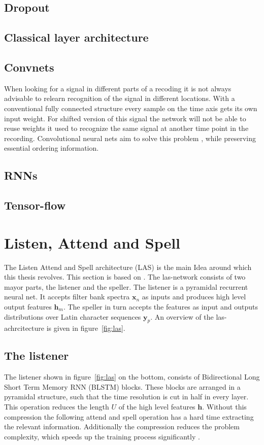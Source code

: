 \subsection{Dropout}

\subsection{Classical layer architecture}


\subsection{Convnets}
When looking for a signal in different parts of a recoding it is not always advisable to relearn recognition
of the signal in different locations. With a conventional fully connected structure every sample on the time axis gets its own input weight. For shifted version of this signal the network will not be able to reuse weights it used
to recognize the same signal at another time point in the recording.
Convolutional neural nets aim to solve this problem \cite[page 6]{Dumoulin2016}, while preserving essential ordering information.

\subsection{RNNs}


\subsection{Tensor-flow}


\section{Listen, Attend and Spell}
The Listen Attend and Spell architecture (LAS) is the main Idea around which this thesis revolves. This section is based on \cite{Chan2015}. The las-network consists of two mayor parts, the listener and the speller. The listener is a pyramidal recurrent neural net. It accepts filter bank spectra $\mathbf{x}_n$ as inputs and produces high level output features $\mathbf{h}_m$. The speller in turn accepts the features as input and outputs distributions over Latin character sequences $\mathbf{y}_p$. An overview of the las-achrcitecture is given in figure~\ref*{fig:las}.

\subsection{The listener}
The listener shown in figure~\ref*{fig:las} on the bottom, consists of Bidirectional Long Short Term Memory RNN (BLSTM) blocks. These blocks are arranged in a pyramidal structure, such that the time resolution is cut in half in every layer. This operation reduces the length $U$ of the high level features $\mathbf{h}$. Without this compression the following attend and spell operation has a hard time extracting the relevant information. Additionally the compression reduces the problem complexity, which speeds up the training process significantly \cite[page 4]{Chan2015}.    

